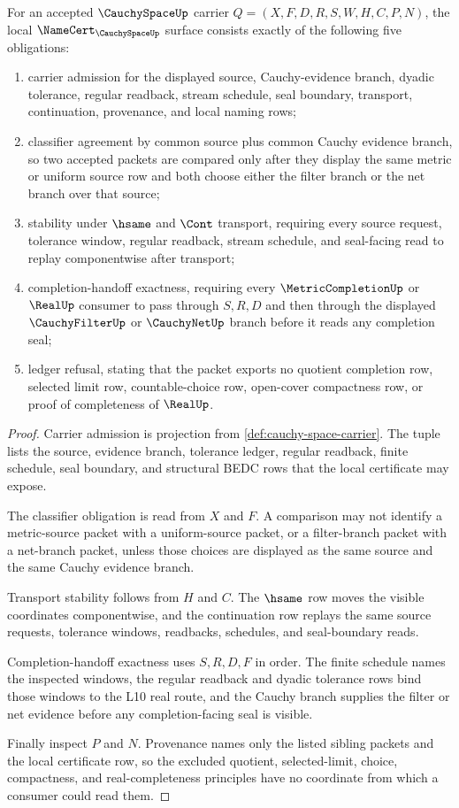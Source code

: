 \begin{theorem}
\label{thm:cauchy-space-namecert-obligation-surface}
For an accepted $\CauchySpaceUp$ carrier $Q=(X,F,D,R,S,W,H,C,P,N)$, the local $\NameCert_{\CauchySpaceUp}$ surface consists exactly of the following five obligations:
\begin{enumerate}
\item carrier admission for the displayed source, Cauchy-evidence branch, dyadic tolerance, regular readback, stream schedule, seal boundary, transport, continuation, provenance, and local naming rows;
\item classifier agreement by common source plus common Cauchy evidence branch, so two accepted packets are compared only after they display the same metric or uniform source row and both choose either the filter branch or the net branch over that source;
\item stability under $\hsame$ and $\Cont$ transport, requiring every source request, tolerance window, regular readback, stream schedule, and seal-facing read to replay componentwise after transport;
\item completion-handoff exactness, requiring every $\MetricCompletionUp$ or $\RealUp$ consumer to pass through $S,R,D$ and then through the displayed $\CauchyFilterUp$ or $\CauchyNetUp$ branch before it reads any completion seal;
\item ledger refusal, stating that the packet exports no quotient completion row, selected limit row, countable-choice row, open-cover compactness row, or proof of completeness of $\RealUp$.
\end{enumerate}
\end{theorem}
\begin{proof}
Carrier admission is projection from \autoref{def:cauchy-space-carrier}. The tuple lists the source, evidence branch, tolerance ledger, regular readback, finite schedule, seal boundary, and structural BEDC rows that the local certificate may expose.

The classifier obligation is read from $X$ and $F$. A comparison may not identify a metric-source packet with a uniform-source packet, or a filter-branch packet with a net-branch packet, unless those choices are displayed as the same source and the same Cauchy evidence branch.

Transport stability follows from $H$ and $C$. The $\hsame$ row moves the visible coordinates componentwise, and the continuation row replays the same source requests, tolerance windows, readbacks, schedules, and seal-boundary reads.

Completion-handoff exactness uses $S,R,D,F$ in order. The finite schedule names the inspected windows, the regular readback and dyadic tolerance rows bind those windows to the L10 real route, and the Cauchy branch supplies the filter or net evidence before any completion-facing seal is visible.

Finally inspect $P$ and $N$. Provenance names only the listed sibling packets and the local certificate row, so the excluded quotient, selected-limit, choice, compactness, and real-completeness principles have no coordinate from which a consumer could read them.
\end{proof}

